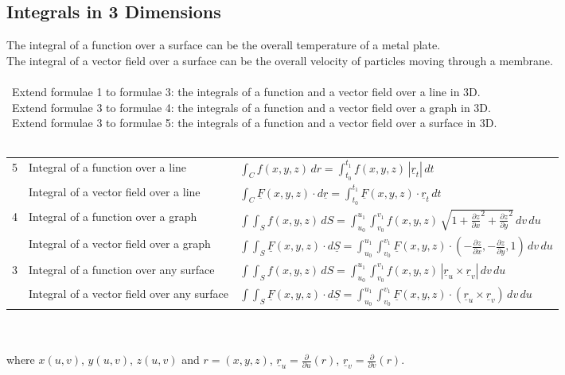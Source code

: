 \documentclass{article}
\begin{document}
		\subsection{Integrals in 3 Dimensions}
			The integral of a function over a surface can be the overall temperature of a metal plate. \\
			The integral of a vector field over a surface can be the overall velocity of particles moving through a membrane. \\
			\\
			\textbullet\ Extend formulae 1 to formulae 3: the integrals of a function and a vector field over a line in 3D. \\
			\textbullet\ Extend formulae 3 to formulae 4: the integrals of a function and a vector field over a graph in 3D. \\
			\textbullet\ Extend formulae 3 to formulae 5: the integrals of a function and a vector field over a surface in 3D. \\
			\\
			\begin{tabular}{| c | l | l |}
			\hline
			\multirow{2}{*}{5}	& Integral of a function over a line			& $\int_{C} f(x,y,z) \,dr = \int_{t_{0}}^{t_{1}} f(x,y,z) \,|\underline{r}_{t}| \,dt$ \\
								\cline{2-3}
								& Integral of a vector field over a line		& $\int_{C} \underline{F}(x,y,z) \cdot d\underline{r} = \int_{t_{0}}^{t_{1}} \underline{F}(x,y,z) \cdot \underline{r}_{t} \,dt$ \\
			\hline\hline
			\multirow{2}{*}{4}	& Integral of a function over a graph			& $\int\int_{S} f(x,y,z) \,dS = \int_{u_{0}}^{u_{1}}\int_{v_{0}}^{v_{1}} f(x,y,z) \,\sqrt{1+\frac{\partial z}{\partial x}^2+\frac{\partial z}{\partial y}^2} \,dv\,du$ \\
								\cline{2-3}
								& Integral of a vector field over a graph		& $\int\int_{S} \underline{F}(x,y,z) \cdot d\underline{S} = \int_{u_{0}}^{u_{1}}\int_{v_{0}}^{v_{1}} \underline{F}(x,y,z) \cdot (-\frac{\partial z}{\partial x},-\frac{\partial z}{\partial y},1) \,dv\,du$ \\
			\hline\hline
			\multirow{2}{*}{3}	& Integral of a function over any surface		& $\int\int_{S} f(x,y,z) \,dS = \int_{u_{0}}^{u_{1}}\int_{v_{0}}^{v_{1}} f(x,y,z) \,|\underline{r}_{u} \times \underline{r}_{v}| \,dv\,du$ \\
								\cline{2-3}
								& Integral of a vector field over any surface	& $\int\int_{S} \underline{F}(x,y,z) \cdot d\underline{S} = \int_{u_{0}}^{u_{1}}\int_{v_{0}}^{v_{1}} \underline{F}(x,y,z) \cdot (\underline{r}_{u} \times \underline{r}_{v}) \,dv\,du$ \\
			\hline
			\end{tabular} \\
			\\
			where $x(u,v)$, $y(u,v)$, $z(u,v)$ and $r=(x,y,z)$, $\underline{r}_{u} = \frac{\partial}{\partial u}(r)$, $\underline{r}_{v} = \frac{\partial}{\partial v}(r).$ \\
	
\end{document}
